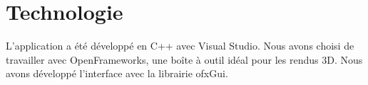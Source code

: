 \chapter{Technologie}
\label{s:technologie}

L’application a été développé en C++ avec Visual Studio. Nous avons choisi de travailler avec OpenFrameworks, une boîte à outil idéal pour les rendus 3D. Nous avons développé l’interface avec la librairie ofxGui.\\